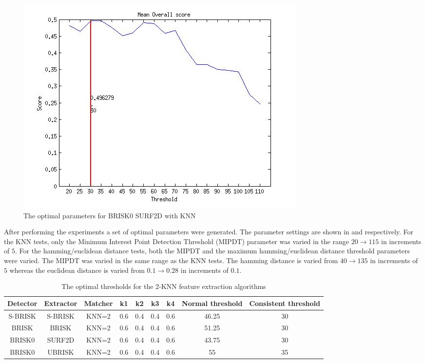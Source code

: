 \documentclass{article}
\begin{document}
\begin{figure}[h!]
\begin{minipage}[b]{0.5\linewidth}
\includegraphics[scale=0.5]{../Drawings/OptimalParameters_SBRISK_SURF2D_KNN.jpg}
\caption{The optimal parameters for BRISK0 SURF2D with KNN}
\label{fig:BRISK0surfknnOptimal}
\end{minipage}
\end{figure}

After performing the experiments a set of optimal parameters were generated. The parameter settings are shown in  and  respectively. For the KNN tests, only the Minimum Interest Point Detection Threshold (MIPDT) parameter was varied in the range $20 \rightarrow 115$ in increments of $5$. For the hamming/euclidean distance tests, both the MIPDT and the maximum hamming/euclidean distance threshold parameters were varied. The MIPDT was varied in the same range as the KNN tests. The hamming distance is varied from $40 \rightarrow 135$ in increments of $5$ whereas the euclidean distance is varied from $0.1 \rightarrow 0.28$ in increments of $0.1$. \\



\begin{table}
\caption{The optimal thresholds for the 2-KNN feature extraction algorithms}
\begin{tabular}{|c|c|c|c|c|c|c|c|c|}
\hline 
Detector & Extractor & Matcher & k1 & k2 & k3 & k4 & Normal threshold & Consistent threshold\tabularnewline
\hline 
\hline 
S-BRISK & S-BRISK & KNN=2 & 0.6 & 0.4 & 0.4 & 0.6 & 46.25 & 30\tabularnewline
\hline 
BRISK & BRISK & KNN=2 & 0.6 & 0.4 & 0.4 & 0.6 & 51.25 & 30\tabularnewline
\hline 
BRISK0 & SURF2D & KNN=2 & 0.6 & 0.4 & 0.4 & 0.6 & 43.75 & 30\tabularnewline
\hline 
BRISK0 & UBRISK & KNN=2 & 0.6 & 0.4 & 0.4 & 0.6 & 55 & 35\tabularnewline
\hline 
\end{tabular}
\label{tab:knnStatistics}
\end{table}
\end{document}
